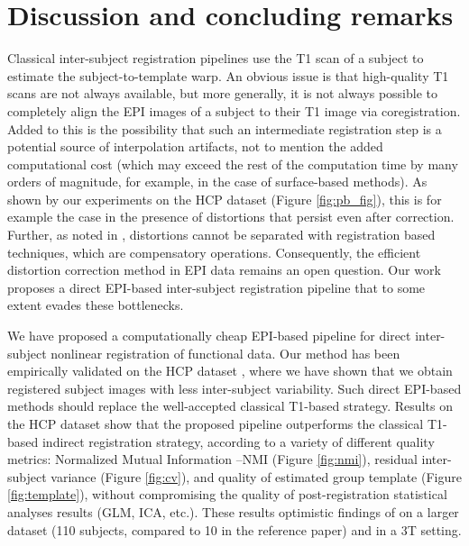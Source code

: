 \section{Discussion and concluding remarks}
\label{sec:discussion}
Classical inter-subject registration pipelines use the T1 scan of a
subject to estimate the subject-to-template warp.
%
An obvious issue is that high-quality T1 scans are not always
available, but more generally, it is not always possible to completely
align the EPI images of a subject to their T1 image via
coregistration. Added to this is the possibility that such an intermediate registration step is
a potential source of interpolation artifacts, not to mention the added computational cost (which may exceed the rest of the computation time by many orders of magnitude, for example, in the case of surface-based methods). As shown by our experiments on the HCP dataset
\cite{VanEssen20122222} (Figure \ref{fig:pb_fig}), this is for example
the case in the presence of distortions
\cite{pmid9178246,pmid12270226,zeng2002,anderson2003} that persist
even after correction.  Further, as noted in \cite{pmid25405472},
distortions cannot be separated with registration based techniques,
which are compensatory operations. Consequently, the efficient
distortion correction method in EPI data remains an
open question. Our work proposes a direct EPI-based inter-subject
registration pipeline that to some extent evades these bottlenecks.

We have proposed a computationally cheap EPI-based pipeline for direct inter-subject nonlinear registration of functional data. Our method has been empirically validated on the HCP dataset \cite{VanEssen20122222}, where we have shown that we obtain registered subject images with less inter-subject variability. Such direct EPI-based methods should replace the well-accepted classical
T1-based strategy.
Results on the HCP dataset \cite{VanEssen20122222} show that the proposed pipeline outperforms the classical T1-based indirect registration strategy, according to a variety of different quality metrics: Normalized Mutual Information --NMI (Figure \ref{fig:nmi}), residual inter-subject
variance (Figure \ref{fig:cv}), and quality of estimated group template (Figure \ref{fig:template}), without compromising the quality of post-registration statistical analyses results (GLM, ICA, etc.).
These results optimistic findings of \cite{grabner2014} on a larger dataset (110 subjects, compared to 10 in the reference paper) and in a 3T setting.

